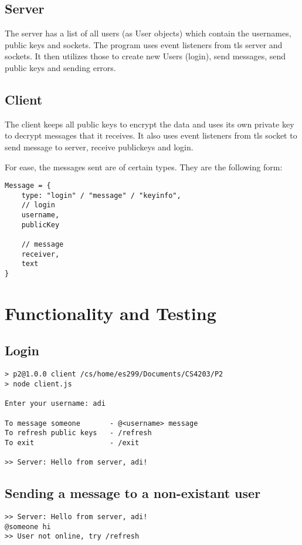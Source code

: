 \documentclass[11pt]{article}
\begin{document}
\subsection{Server}
\label{sec:org4368ce4}
The server has a list of all users (as User objects) which contain the usernames, public keys and sockets. The program uses event listeners from tls server and sockets. It then utilizes those to create new Users (login), send messages, send public keys and sending errors.

\subsection{Client}
\label{sec:orgbf0fcb7}
The client keeps all public keys to encrypt the data and uses its own private key to decrypt messages that it receives. It also uses event listeners from tls socket to send message to server, receive publickeys and login.

For ease, the messages sent are of certain types. They are the following form:
\begin{verbatim}
Message = {
    type: "login" / "message" / "keyinfo",
    // login
    username,
    publicKey

    // message
    receiver,
    text
}
\end{verbatim}

\section{Functionality and Testing}
\label{sec:org9681ec2}
\subsection{Login}
\label{sec:org02610a6}
\begin{verbatim}
> p2@1.0.0 client /cs/home/es299/Documents/CS4203/P2
> node client.js

Enter your username: adi

To message someone       - @<username> message
To refresh public keys   - /refresh
To exit                  - /exit

>> Server: Hello from server, adi!
\end{verbatim}

\subsection{Sending a message to a non-existant user}
\label{sec:orgda7d9f5}
\begin{verbatim}
>> Server: Hello from server, adi!
@someone hi
>> User not online, try /refresh
\end{verbatim}
\end{document}
